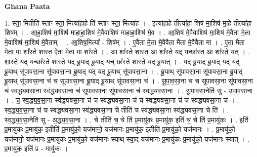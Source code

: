 \documentclass[17pt]{extarticle}
\begin{document}
\textbf{Ghana Paata } \newline

1. स्ता॒ मितीति॑ स्ताꣳ स्ता॒ मित्या॑हा॒हे ति॑ स्ताꣳ स्ता॒ मित्या॑ह । . इत्या॑हा॒हे तीत्या॑हा॒ शिष॑ मा॒शिष॑ मा॒हे तीत्या॑हा॒ शिष᳚म् । . आ॒हा॒शिष॑ मा॒शिष॑ माहाहा॒शिष॑ मे॒वैवाशिष॑ माहाहा॒शिष॑ मे॒व । . आ॒शिष॑ मे॒वैवाशिष॑ मा॒शिष॑ मे॒वैता मे॒ता मे॒वाशिष॑ मा॒शिष॑ मे॒वैताम् । . आ॒शिष॒मित्या᳚ - शिष᳚म् । . ए॒वैता मे॒ता मे॒वैवैता मैता मे॒वैवैता मा । . ए॒ता मैता मे॒ता मा शा᳚स्ते शास्त॒ ऐता मे॒ता मा शा᳚स्ते । . आ शा᳚स्ते शास्त॒ आ शा᳚स्ते॒ यद् यच्छा᳚स्त॒ आ शा᳚स्ते॒ यत् । . शा॒स्ते॒ यद् यच्छा᳚स्ते शास्ते॒ यद् ब्रू॒याद् ब्रू॒याद् यच् छा᳚स्ते शास्ते॒ यद् ब्रू॒यात् । . यद् ब्रू॒याद् ब्रू॒याद् यद् यद् ब्रू॒याथ् सू॑पावसा॒ना सू॑पावसा॒ना ब्रू॒याद् यद् यद् ब्रू॒याथ् सू॑पावसा॒ना । . ब्रू॒याथ् सू॑पावसा॒ना सू॑पावसा॒ना ब्रू॒याद् ब्रू॒याथ् सू॑पावसा॒ना च॑ च सूपावसा॒ना ब्रू॒याद् ब्रू॒याथ् सू॑पावसा॒ना च॑ । . सू॒पा॒व॒सा॒ना च॑ च सूपावसा॒ना सू॑पावसा॒ना च॑ स्वद्ध्यवसा॒ना स्व॑द्ध्यवसा॒ना च॑ सूपावसा॒ना सू॑पावसा॒ना च॑ स्वद्ध्यवसा॒ना । . सू॒पा॒व॒सा॒नेति॑ सु - उ॒पा॒व॒सा॒ना । . च॒ स्व॒द्ध्य॒व॒सा॒ना स्व॑द्ध्यवसा॒ना च॑ च स्वद्ध्यवसा॒ना च॑ च स्वद्ध्यवसा॒ना च॑ च स्वद्ध्यवसा॒ना च॑ । . स्व॒द्ध्य॒व॒सा॒ना च॑ च स्वद्ध्यवसा॒ना स्व॑द्ध्यवसा॒ना चे तीति॑ च स्वद्ध्यवसा॒ना स्व॑द्ध्यवसा॒ना चे ति॑ । . स्व॒द्ध्य॒व॒सा॒नेति॑ सु - अ॒द्ध्य॒व॒सा॒ना । . चे तीति॑ च॒ चे ति॑ प्र॒मायु॑कः प्र॒मायु॑क॒ इति॑ च॒ चे ति॑ प्र॒मायु॑कः । . इति॑ प्र॒मायु॑कः प्र॒मायु॑क॒ इतीति॑ प्र॒मायु॑को॒ यज॑मानो॒ यज॑मानः प्र॒मायु॑क॒ इतीति॑ प्र॒मायु॑को॒ यज॑मानः । . प्र॒मायु॑को॒ यज॑मानो॒ यज॑मानः प्र॒मायु॑कः प्र॒मायु॑को॒ यज॑मानः स्याथ् स्या॒द् यज॑मानः प्र॒मायु॑कः प्र॒मायु॑को॒ यज॑मानः स्यात् । . प्र॒मायु॑क॒ इति॑ प्र - मायु॑कः । \newline
\end{document}
